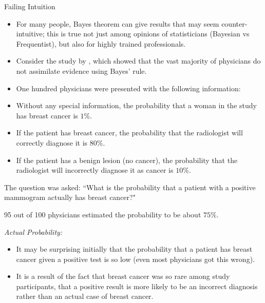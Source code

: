 \begin{frame}[allowframebreaks]{Failing Intuition}

    \begin{itemize}
      \item For many people, Bayes theorem can give results that may seem counter-intuitive; this is true not just among opinions of statisticians (Bayesian vs Frequentist), but also for highly trained professionals.

      \item Consider the study by \citet{eddy82}, which showed that the vast majority of physicians do not assimilate evidence using Bayes' rule.

      \item One hundred physicians were presented with the following information:

    \framebreak

      \item Without any special information, the probability that a woman in the study has breast cancer is $1\%$.
      \item If the patient has breast cancer, the probability that the radiologist will correctly diagnose it is $80\%$.
      \item If the patient has a benign lesion (no cancer), the probability that the radiologist will incorrectly diagnose it as cancer is $10\%$.
      \end{itemize}

      The question was asked: ``What is the probability that a patient with a positive mammogram actually has breast cancer?"

      95 out of 100 physicians estimated the probability to be about $75\%$.

      \framebreak

      \emph{Actual Probability:}


      \framebreak

      \begin{itemize}
        \item It may be surprising initially that the probability that a patient has breast cancer given a positive test is so low (even most physicians got this wrong).
        \item It is a result of the fact that breast cancer was so rare among study participants, that a positive result is more likely to be an incorrect diagnosis rather than an actual case of breast cancer.
      \end{itemize}

\end{frame}

